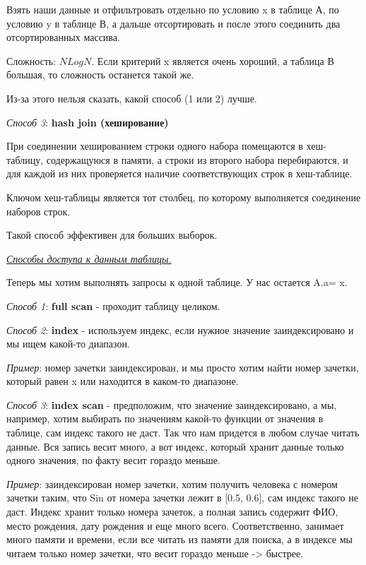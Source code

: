 Взять наши данные и отфильтровать отдельно по условию x в таблице А, по условию y в таблице В, а дальше отсортировать и после этого соединить два отсортированных массива.

Сложность: $NLogN$. Если критерий x является очень хороший, а таблица В большая, то сложность останется такой же. 

Из-за этого нельзя сказать, какой способ (1 или 2) лучше. 

\textit{Способ 3}: \textbf{hash join (хеширование)}

При соединении хешированием строки одного набора помещаются в
хеш-таблицу, содержащуюся в памяти, а строки из второго набора
перебираются, и для каждой из них проверяется наличие
соответствующих строк в хеш-таблице.

Ключом хеш-таблицы является тот столбец, по которому выполняется
соединение наборов строк.

Такой способ эффективен для больших выборок. 


\begin{center}
\textit{\underline{Способы доступа к данным таблицы.}}
\end{center}

Теперь мы хотим выполнять запросы к одной таблице. У нас остается A.a= x. 

\textit{Способ 1}: \textbf{full scan} - проходит таблицу целиком. 

\textit{Способ 2}: \textbf{index} - используем индекс, если нужное значение заиндексировано и мы ищем какой-то диапазон. 

\textit{Пример}: номер зачетки заиндексирован, и мы просто хотим найти номер зачетки, который равен x или находится в каком-то диапазоне. 

\textit{Способ 3}: \textbf{index scan} - предположим, что значение заиндексировано, а мы, например, хотим выбирать по значениям какой-то функции от значения в таблице, сам индекс такого не даст. Так что нам придется в любом случае читать данные. Вся запись весит много, а вот индекс, который хранит данные только одного значения, по факту весит гораздо меньше. 

\textit{Пример}: заиндексирован номер зачетки, хотим получить человека с номером зачетки таким, что Sin от номера зачетки лежит в [0.5, 0.6], сам индекс такого не даст. Индекс хранит только номера зачеток, а полная запись содержит ФИО, место рождения, дату рождения и еще много всего. Соответственно, занимает много памяти и времени, если все читать из памяти для поиска, а в индексе мы читаем только номер зачетки, что весит гораздо меньше -> быстрее. 

